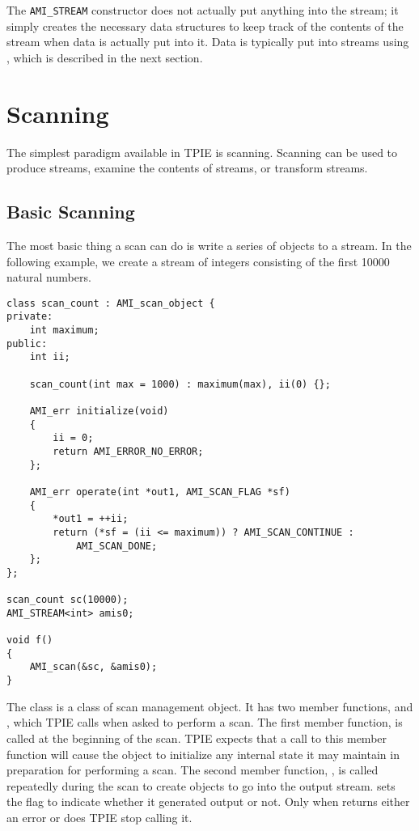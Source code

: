 The {\tt AMI\_STREAM} constructor does not actually put anything into
the stream; it simply creates the necessary data structures to keep
track of the contents of the stream when data is actually put into it.
Data is typically put into streams using , which is
described in the next section.

\section{Scanning}
\label{sec:scanning}

 
The simplest paradigm available in TPIE is scanning.  Scanning can be
used to produce streams, examine the contents of streams, or transform
streams.  

\subsection{Basic Scanning}

The most basic thing a scan can do is write a series of objects to a
stream.  In the following example, we create a stream of integers
consisting of the first 10000 natural numbers.

\begin{verbatim}
class scan_count : AMI_scan_object {
private:
    int maximum;
public:
    int ii;

    scan_count(int max = 1000) : maximum(max), ii(0) {};

    AMI_err initialize(void) 
    {
        ii = 0;
        return AMI_ERROR_NO_ERROR;
    };

    AMI_err operate(int *out1, AMI_SCAN_FLAG *sf)
    {
        *out1 = ++ii;
        return (*sf = (ii <= maximum)) ? AMI_SCAN_CONTINUE : 
            AMI_SCAN_DONE;
    };
};

scan_count sc(10000);
AMI_STREAM<int> amis0;    

void f()
{
    AMI_scan(&sc, &amis0);
}
\end{verbatim}

The class  is a class of scan management
object.  It has two member
functions,  and , which TPIE calls
when asked to perform a scan.  The first member function,
 is called at the beginning of the scan.  TPIE
expects that a call to this member function will cause the object to
initialize any internal state it may maintain in preparation for
performing a scan.  The second member function, , is
called repeatedly during the scan to create objects to go into the
output stream.   sets the flag  to indicate
whether it generated output or not.  Only when 
returns either an error or  does TPIE stop calling
it.

